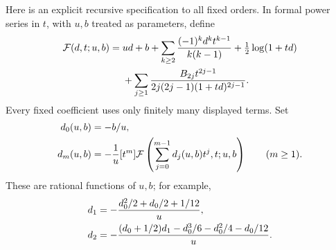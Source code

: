 \documentclass[11pt,letterpaper]{article}
\numberwithin{equation}{section}
\theoremstyle{remark}\newtheorem{remark}[theorem]{Remark}
\begin{document}
Here is an explicit recursive specification to all fixed orders.
In formal power series in $t$, with $u,b$ treated as parameters,
define
\begin{align}
 \mathcal F(d,t;u,b)={}&ud+b
 +\sum_{k\geq2}\frac{(-1)^kd^kt^{k-1}}{k(k-1)}
 +\tfrac12\log(1+td)\notag\\
 &+\sum_{j\geq1}\frac{B_{2j}t^{2j-1}}
            {2j(2j-1)(1+td)^{2j-1}}.\label{psp:op:eq:formalF}
\end{align}
Every fixed coefficient uses only finitely many displayed terms.
Set
\begin{align}
 d_0(u,b)&=-b/u,\notag\\
 d_m(u,b)&=-\frac1u[t^m]\mathcal F
       \left(\sum_{j=0}^{m-1}d_j(u,b)t^j,t;u,b\right)
       \qquad(m\geq1).\label{psp:op:eq:inverserecurrence}
\end{align}
These are rational functions of $u,b$; for example,
\begin{align}
 d_1&=-\frac{d_0^2/2+d_0/2+1/12}{u},\notag\\
 d_2&=-\frac{(d_0+1/2)d_1-d_0^3/6-d_0^2/4-d_0/12}{u}.
 \label{psp:op:eq:firstcoeffs}
\end{align}
\end{document}
